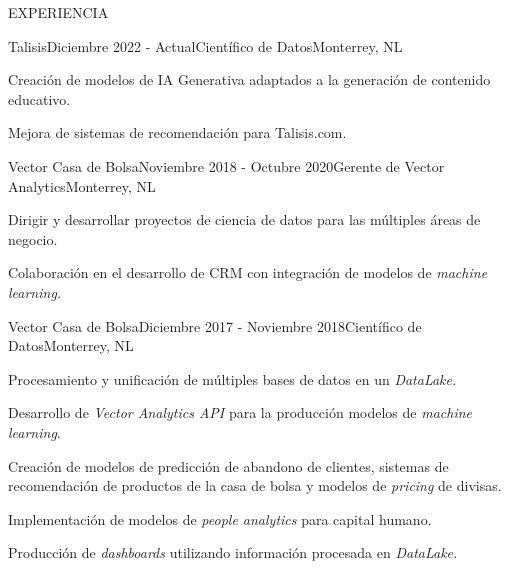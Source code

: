 \documentclass{resume} %
\begin{document}


\begin{rSection}{EXPERIENCIA}

\begin{rSubsection}{Talisis}{Diciembre 2022 - Actual}{Científico de Datos}{Monterrey, NL}
    \item Creación de modelos de IA Generativa adaptados a la generación de contenido educativo.
    \item Mejora de sistemas de recomendación para Talisis.com.
\end{rSubsection}

\begin{rSubsection}{Vector Casa de Bolsa}{Noviembre 2018 - Octubre 2020}{Gerente de Vector Analytics}{Monterrey, NL}
\item Dirigir y desarrollar proyectos de ciencia de datos para las múltiples áreas de negocio.
\item Colaboración en el desarrollo de CRM con integración de modelos de \textit{machine learning.}
\end{rSubsection}

\begin{rSubsection}{Vector Casa de Bolsa}{Diciembre 2017 - Noviembre 2018}{Científico de Datos}{Monterrey, NL}

\item Procesamiento y unificación de múltiples bases de datos en un \textit{DataLake.}
\item Desarrollo de \textit{Vector Analytics API} para la producción modelos de \textit{machine learning}.
\item Creación de modelos de predicción de abandono de clientes, sistemas de recomendación de productos de la casa de bolsa y modelos de \textit{pricing} de divisas.
\item Implementación de modelos de \textit{people analytics} para capital humano.
\item Producción de \textit{dashboards} utilizando información procesada en \textit{DataLake.}
\end{rSubsection}


\end{rSection}
\end{document}
